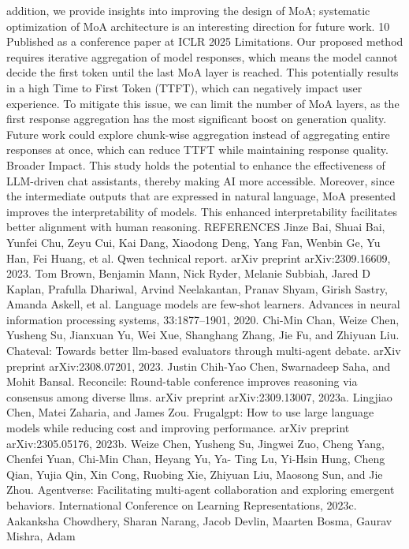 addition, we provide insights into improving the design of MoA; systematic optimization of MoA
architecture is an interesting direction for future work.
10
Published as a conference paper at ICLR 2025
Limitations.
Our proposed method requires iterative aggregation of model responses, which means
the model cannot decide the first token until the last MoA layer is reached. This potentially results
in a high Time to First Token (TTFT), which can negatively impact user experience. To mitigate
this issue, we can limit the number of MoA layers, as the first response aggregation has the most
significant boost on generation quality. Future work could explore chunk-wise aggregation instead of
aggregating entire responses at once, which can reduce TTFT while maintaining response quality.
Broader Impact.
This study holds the potential to enhance the effectiveness of LLM-driven chat
assistants, thereby making AI more accessible. Moreover, since the intermediate outputs that are
expressed in natural language, MoA presented improves the interpretability of models. This enhanced
interpretability facilitates better alignment with human reasoning.
REFERENCES
Jinze Bai, Shuai Bai, Yunfei Chu, Zeyu Cui, Kai Dang, Xiaodong Deng, Yang Fan, Wenbin Ge,
Yu Han, Fei Huang, et al. Qwen technical report. arXiv preprint arXiv:2309.16609, 2023.
Tom Brown, Benjamin Mann, Nick Ryder, Melanie Subbiah, Jared D Kaplan, Prafulla Dhariwal,
Arvind Neelakantan, Pranav Shyam, Girish Sastry, Amanda Askell, et al. Language models are
few-shot learners. Advances in neural information processing systems, 33:1877–1901, 2020.
Chi-Min Chan, Weize Chen, Yusheng Su, Jianxuan Yu, Wei Xue, Shanghang Zhang, Jie Fu, and
Zhiyuan Liu. Chateval: Towards better llm-based evaluators through multi-agent debate. arXiv
preprint arXiv:2308.07201, 2023.
Justin Chih-Yao Chen, Swarnadeep Saha, and Mohit Bansal. Reconcile: Round-table conference
improves reasoning via consensus among diverse llms. arXiv preprint arXiv:2309.13007, 2023a.
Lingjiao Chen, Matei Zaharia, and James Zou. Frugalgpt: How to use large language models while
reducing cost and improving performance. arXiv preprint arXiv:2305.05176, 2023b.
Weize Chen, Yusheng Su, Jingwei Zuo, Cheng Yang, Chenfei Yuan, Chi-Min Chan, Heyang Yu, Ya-
Ting Lu, Yi-Hsin Hung, Cheng Qian, Yujia Qin, Xin Cong, Ruobing Xie, Zhiyuan Liu, Maosong
Sun, and Jie Zhou. Agentverse: Facilitating multi-agent collaboration and exploring emergent
behaviors. International Conference on Learning Representations, 2023c.
Aakanksha Chowdhery, Sharan Narang, Jacob Devlin, Maarten Bosma, Gaurav Mishra, Adam
